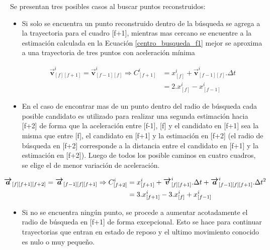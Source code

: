 Se presentan tres posibles casos al buscar puntos reconstruidos:

\begin{itemize}

\item Si solo se encuentra un punto reconstruido dentro de la búsqueda se agrega a la trayectoria para el cuadro [f+1], mientras mas cercano se encuentre a la estimación calculada en la Ecuación \ref{centro_busqueda_f1} mejor se aproxima a una trayectoria de tres puntos con aceleración mínima

\begin{equation}
\begin{split}
\boldsymbol{\overrightarrow{v}}_{[f][f+1]}^{i} = \boldsymbol{\overrightarrow{v}}_{[f-1][f]}^{i} \Rightarrow C_{[f+1]}^{i} &= x_{[f]}^{i} + \boldsymbol{\overrightarrow{v}}_{[f-1][f]}^{i}.\Delta{t} \\
&= 2.x_{[f]}^{i} -x_{[f-1]}^{i} 
\end{split}
\label{centro_busqueda_f1}
\end{equation}

\item En el caso de encontrar mas de un punto dentro del radio de búsqueda cada posible candidato es utilizado para realizar una segunda estimación hacia [f+2] de forma que la aceleración entre [f-1], [f] y el candidato en [f+1] sea la misma que entre [f], el candidato en [f+1] y la estimación en [f+2] (el radio de búsqueda en [f+2] corresponde a la distancia entre el candidato en [f+1] y la estimación en [f+2]). Luego de todos los posible caminos en cuatro cuadros, se elige el de menor variación de aceleración.

\begin{equation}
\hspace{-1cm}
\begin{split}
\boldsymbol{\overrightarrow{a}}_{[f][f+1][f+2]}=\boldsymbol{\overrightarrow{a}}_{[f-1][f][f+1]} \Rightarrow C_{[f+2]}^{i} &= x_{[f+1]}^{i} + \boldsymbol{\overrightarrow{v}}_{[f][f+1]}^{i}.\Delta{t} + \boldsymbol{\overrightarrow{a}}_{[f-1][f][f+1]}^{i}.\Delta{t}^2\\
&= 3.x_{[f+1]}^{i} - 3.x_{[f]}^{i} + x_{[f-1]}^{i}\end{split}
\label{centro_busqueda_f2}
\end{equation}

\item Si no se encuentra ningún punto, se procede a aumentar acotadamente el radio de búsqueda en [f+1] de forma excepcional. Esto se hace para continuar trayectorias que entran en estado de reposo y el ultimo movimiento conocido es nulo o muy pequeño.

\end{itemize}

